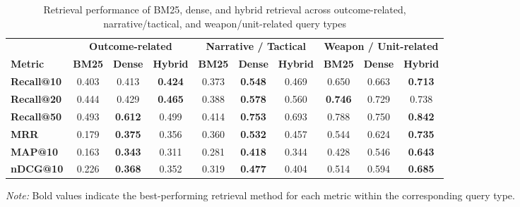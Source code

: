 \begin{table}[H]
    \centering
    \caption{Retrieval performance of BM25, dense, and hybrid retrieval across outcome-related, narrative/tactical, and weapon/unit-related query types}
    \label{tab:retrieval_query_types_2}

    \scriptsize
    \renewcommand{\arraystretch}{1.4}
    \setlength{\tabcolsep}{3pt}

    \begin{tabular}{l ccc ccc ccc}
        \toprule
        & \multicolumn{3}{c}{\textbf{Outcome-related}}
        & \multicolumn{3}{c}{\textbf{Narrative / Tactical}}
        & \multicolumn{3}{c}{\textbf{Weapon / Unit-related}} \\
        \cmidrule(lr){2-4}
        \cmidrule(lr){5-7}
        \cmidrule(lr){8-10}

        \textbf{Metric} &
        \textbf{BM25} & \textbf{Dense} & \textbf{Hybrid} &
        \textbf{BM25} & \textbf{Dense} & \textbf{Hybrid} &
        \textbf{BM25} & \textbf{Dense} & \textbf{Hybrid} \\
        \midrule

        \textbf{Recall@10} &
        0.403 & 0.413 & \textbf{0.424} &
        0.373 & \textbf{0.548} & 0.469 &
        0.650 & 0.663 & \textbf{0.713} \\

        \textbf{Recall@20} &
        0.444 & 0.429 & \textbf{0.465} &
        0.388 & \textbf{0.578} & 0.560 &
        \textbf{0.746} & 0.729 & 0.738 \\

        \textbf{Recall@50} &
        0.493 & \textbf{0.612} & 0.499 &
        0.414 & \textbf{0.753} & 0.693 &
        0.788 & 0.750 & \textbf{0.842} \\

        \textbf{MRR} &
        0.179 & \textbf{0.375} & 0.356 &
        0.360 & \textbf{0.532} & 0.457 &
        0.544 & 0.624 & \textbf{0.735} \\

        \textbf{MAP@10} &
        0.163 & \textbf{0.343} & 0.311 &
        0.281 & \textbf{0.418} & 0.344 &
        0.428 & 0.546 & \textbf{0.643} \\

        \textbf{nDCG@10} &
        0.226 & \textbf{0.368} & 0.352 &
        0.319 & \textbf{0.477} & 0.404 &
        0.514 & 0.594 & \textbf{0.685} \\

        \bottomrule
    \end{tabular}

    \par\vspace{4pt}
    \begin{minipage}{\linewidth}
        \footnotesize
        \textit{Note:} Bold values indicate the best-performing
        retrieval method for each metric within the corresponding
        query type.
    \end{minipage}

\end{table}
